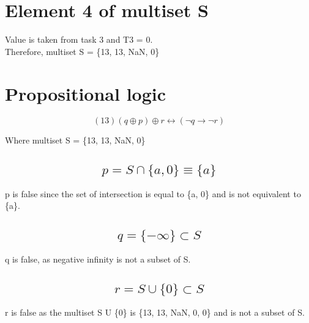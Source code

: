 \documentclass{article}
\begin{document}
\section*{Element 4 of multiset S}
Value is taken from task 3 and T3 = 0.
\\Therefore, multiset S = \{13, 13, NaN, 0\}

\section*{Propositional logic}
\vspace{.7cm}\[(13)(q \oplus p) \oplus r \leftrightarrow (\neg q \rightarrow \neg r)\] 

\vspace{.7cm}Where multiset S = \{13, 13, NaN, 0\}

\subsection*{ \[p = S \cap \{a, 0\} \equiv \{a\}\]}
p is false since the set of intersection is equal to \{a, 0\} and is not equivalent to \{a\}.

\subsection*{\[q = \{-\infty\} \subset S\]}
q is false, as negative infinity is not a subset of S.

\subsection*{\[r = S \cup \{0\} \subset S \]}
r is false as the multiset S U \{0\} is  \{13, 13, NaN, 0, 0\} and is not a subset of S.
\end{document}
